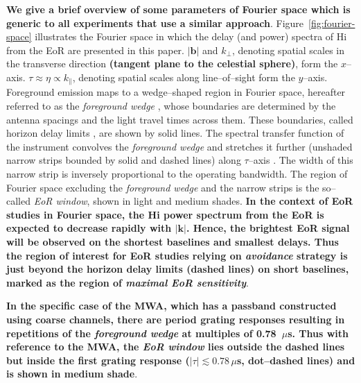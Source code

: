 \documentclass[preprint2,iop,numberedappendix]{emulateapj}
\begin{document}
{\bf We give a brief overview of some parameters of Fourier space which is generic to all experiments that use a similar approach}. Figure~\ref{fig:fourier-space} illustrates the Fourier space in which the delay (and power) spectra of H{\sc i} from the EoR are presented in this paper. $|\boldsymbol{b}|$ and $k_\perp$, denoting spatial scales in the transverse direction {\bf (tangent plane to the celestial sphere)}, form the $x$--axis. $\tau\approx\eta\propto k_\parallel$, denoting spatial scales along line--of--sight form the $y$--axis. Foreground emission maps to a wedge--shaped region in Fourier space, hereafter referred to as the {\it foreground wedge} \citep{dat10}, whose boundaries are determined by the antenna spacings and the light travel times across them. These boundaries, called horizon delay limits \citep{ved12,par12b}, are shown by solid lines. The spectral transfer function of the instrument convolves the {\it foreground wedge} and stretches it further (unshaded narrow strips bounded by solid and dashed lines) along $\tau$--axis \citep{par12b,thy13}. The width of this narrow strip is inversely proportional to the operating bandwidth. The region of Fourier space excluding the {\it foreground wedge} and the narrow strips is the so--called {\it EoR window}, shown in light and medium shades. {\bf In the context of EoR studies in Fourier space, the H{\sc i} power spectrum from the EoR is expected to decrease rapidly with $|\boldsymbol{k}|$. Hence, the brightest EoR signal will be observed on the shortest baselines and smallest delays. Thus the region of interest for EoR studies relying on {\it avoidance} strategy is just beyond the horizon delay limits (dashed lines) on short baselines, marked as the region of {\it maximal EoR sensitivity}}. 

{\bf In the specific case of the MWA, which has a passband constructed using coarse channels, there are period grating responses resulting in repetitions of the {\it foreground wedge} at multiples of 0.78~$\mu$s. Thus with reference to the MWA, the {\it EoR window} lies outside the dashed lines but inside the first grating response ($|\tau| \lesssim 0.78\,\mu$s, dot--dashed lines) and is shown in medium shade}.
\end{document}
